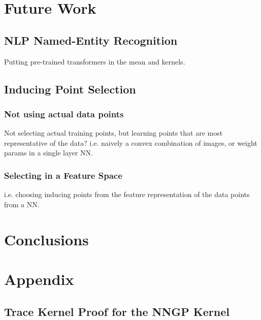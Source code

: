 \documentclass{article}
\numberwithin{equation}{section}
\begin{document}
\section{Future Work}
\subsection{NLP Named-Entity Recognition}
Putting pre-trained transformers in the mean and kernels. 


\subsection{Inducing Point Selection}
\subsubsection{Not using actual data points}
Not selecting actual training points, but learning points that are most representative of the data? i.e. naively a convex combination of images, or weight params in a single layer NN.
\subsubsection{Selecting in a Feature Space}
i.e. choosing inducing points from the feature representation of the data points from a NN.


\newpage
\section{Conclusions}

\newpage



\newpage
\appendix
\section{Appendix}

\subsection{Trace Kernel Proof for the NNGP Kernel}\label{svgp-kld-bayesian}
\end{document}
